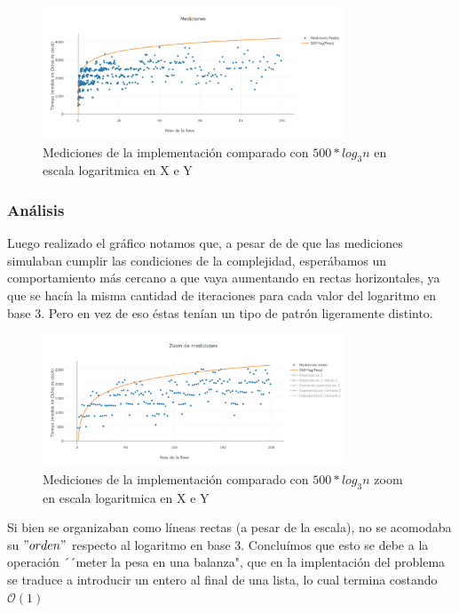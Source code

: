 \documentclass[spanish,12pt]{article}
\begin{document}
{	\begin{figure}[H]
	\centering
	\includegraphics[width=0.8\textwidth]{punto2-mediciones}
	\caption{Mediciones de la implementaci\'on comparado con $500*log_{3}{n}$ en escala logaritmica en X e Y}
	\end{figure}



\subsubsection{Análisis}
Luego realizado el gráfico notamos que, a pesar de de que las mediciones simulaban cumplir las condiciones de la complejidad, esperábamos un comportamiento más cercano a que vaya aumentando en rectas horizontales, ya que se hacía la misma cantidad de iteraciones para cada valor del logaritmo en base 3. Pero en vez de eso éstas tenían un tipo de patrón ligeramente distinto.

\begin{figure}[H]
\centering
\includegraphics[width=0.8\textwidth]{punto2-zoom}
\caption{Mediciones de la implementaci\'on comparado con $500*log_{3}{n}$ zoom en escala logaritmica en X e Y }
\end{figure}
Si bien se organizaban como líneas rectas (a pesar de la escala), no se acomodaba su $"orden"$ respecto al logaritmo en base 3.
Concluímos que esto se debe a la operación ´´meter la pesa en una balanza", que en la implentación del problema se traduce a introducir un entero al final de una lista, lo cual termina costando $\mathcal{O}(1)$

}
\end{document}
